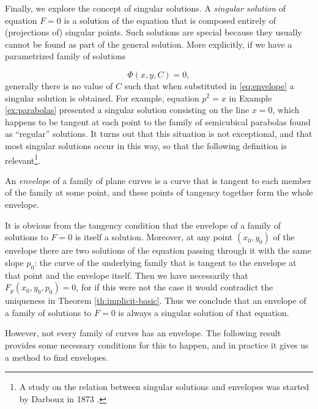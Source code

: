 Finally, we explore the concept of singular solutions. A \textit{singular solution} of equation $F=0$ is a solution of the equation that is composed entirely of (projections of) singular points. Such solutions are special because they usually cannot be found as part of the general solution. More explicitly, if we have a parametrized family of solutions

\begin{equation} \label{eq:envelope}
  \Phi(x,y,C)=0,
\end{equation}
generally there is no value of $C$ such that when substituted in \eqref{eq:envelope} a singular solution is obtained. For example, equation $p^2=x$ in Example \ref{ex:parabolas} presented a singular solution consisting on the line $x=0$, which happens to be tangent at each point to the family of semicubical parabolas found as ``regular'' solutions. It turns out that this situation is not exceptional, and that most singular solutions occur in this way, so that the following definition is relevant\footnote{A study on the relation between singular solutions and envelopes was started by Darboux in 1873 \cite{darboux1873solutions}.}.

\begin{definition}An \textit{envelope} of a family of plane curves is a curve that is tangent to each member of the family at some point, and these points of tangency together form the whole envelope.

\end{definition}

\begin{remark} It is obvious from the tangency condition that the envelope of a family of solutions to $F=0$ is itself a solution. Moreover, at any point $(x_0,y_0)$ of the envelope there are two solutions of the equation passing through it with the same slope $p_0$: the curve of the underlying family that is tangent to the envelope at that point and the envelope itself. Then we have necessarily that $F_p(x_0,y_0,p_0)=0$, for if this were not the case it would contradict the uniqueness in Theorem \ref{th:implicit-basic}. Thus we conclude that an envelope of a family of solutions to $F=0$ is always a singular solution of that equation.
\end{remark}

However, not every family of curves has an envelope. The following result provides some necessary conditions for this to happen, and in practice it gives us a method to find envelopes.

